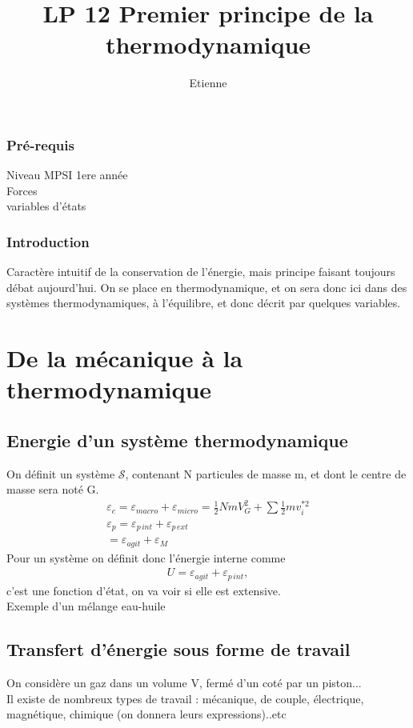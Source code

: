\documentclass[12pt,prb,aps,epsf]{report}
\begin{document}
	
	\title{LP 12 Premier principe de la thermodynamique}
		\author{Etienne}
	
	\maketitle
	
	\tableofcontents
	
	\pagebreak
	
\subsubsection{Pré-requis}
Niveau MPSI 1ere année\\
Forces\\
variables d'états
\subsubsection{Introduction}
Caractère intuitif de la conservation de l'énergie, mais principe faisant toujours débat aujourd'hui. On se place en thermodynamique, et on sera donc ici dans des systèmes thermodynamiques, à l'équilibre, et donc décrit par quelques variables.\\

\section{De la mécanique à la thermodynamique}
\subsection{Energie d'un système thermodynamique}
On définit un système $\mathcal{S}$, contenant N particules de masse m, et dont le centre de masse sera noté G.
\begin{eqnarray}
\varepsilon_c = \varepsilon_{macro} + \varepsilon_{micro} = \frac{1}{2}NmV_G^2 + \sum\frac{1}{2}mv_i^{*2}\\\varepsilon_p = \varepsilon_{p\,int} + \varepsilon_{p\,ext}\\
= \varepsilon_{agit} + \varepsilon_M
\end{eqnarray}
Pour un système on définit donc l'énergie interne comme
\begin{eqnarray}
	U= \varepsilon_{agit} + \varepsilon_{p\,int},
\end{eqnarray}
c'est une fonction d'état, on va voir si elle est extensive.\\
Exemple d'un mélange eau-huile

\subsection{Transfert d'énergie sous forme de travail}
On considère un gaz dans un volume V, fermé d'un coté par un piston...\\
Il existe de nombreux types de travail : mécanique, de couple, électrique, magnétique, chimique (on donnera leurs expressions)..etc
\end{document}
